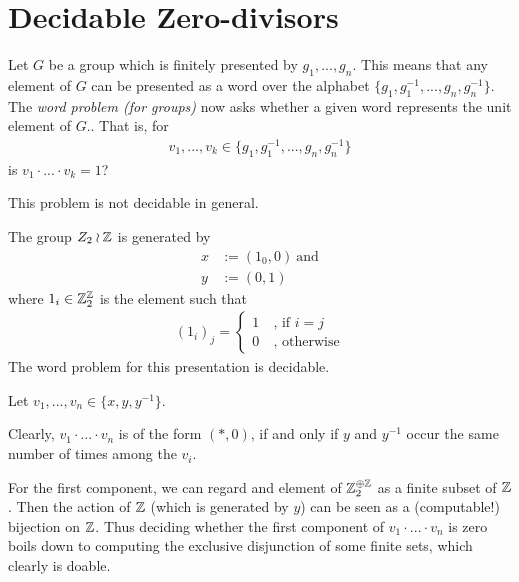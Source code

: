 \section{Decidable Zero-divisors}


\begin{Definition}
	Let $G$ be a group which is finitely presented by $g_1,...,g_n$. This means that any element of $G$ can be presented as a word over the alphabet $\{g_1,g_1^{-1},...,g_n,g_n^{-1}\}$. The \emph{word problem (for groups)} now asks whether a given word represents the unit element of $G$.. That is, for
	\begin{align*}
		v_1,...,v_k \in \{g_1,g_1^{-1},...,g_n,g_n^{-1}\}
	\end{align*}
	is $v_1 \cdot ... \cdot v_k = 1$?
\end{Definition}

This problem is not decidable in general. %

\begin{Example}
	The group $Z_2 \wr \mathbb{Z}$ is generated by
	\begin{align*}
		x &:= (1_0,0) ~\text{and} \\
		y &:= (0,1)
	\end{align*}
	where $1_i \in \mathbb{Z}_2^{\mathbb{Z}}$ is the element such that
	\begin{align*}
		 (1_i)_j = \begin{cases} 1~ &\text{, if $i = j$} \\ 0~ &\text{, otherwise} \end{cases}
	\end{align*}
	The word problem for this presentation is decidable.
\end{Example}
\proof
	Let $v_1,...,v_n \in \{x,y,y^{-1}\}$.

	Clearly, $v_1 \cdot ... \cdot v_n$ is of the form $(*,0)$, if and only if $y$ and $y^{-1}$ occur the same number of times among the $v_i$.\footnotemark

	For the first component, we can regard and element of $\mathbb{Z}_2^{\oplus \mathbb{Z}}$ as a finite subset of $\mathbb{Z}$.
	Then the action of $\mathbb{Z}$ (which is generated by $y$) can be seen as a (computable!) bijection on $\mathbb{Z}$.
	Thus deciding whether the first component of $v_1 \cdot ... \cdot v_n$ is zero boils down to computing the exclusive disjunction of some finite sets, which clearly is doable.
\endproof

